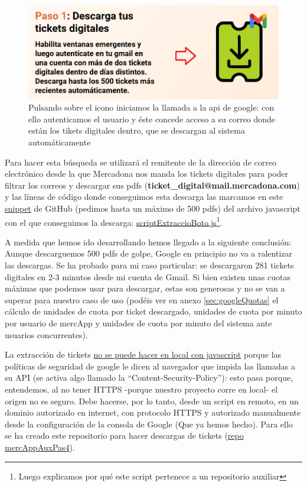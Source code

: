 \documentclass[a4paper,12pt]{report}
\begin{document}
	\begin{figure}[H]
		\centering
		\caption{Pulsando sobre el icono iniciamos la llamada a la api de google: con ello autenticamos el usuario y éste concede acceso a su correo donde están los tikets digitales dentro, que se descargan al sistema automáticamente}
		\includegraphics[width=1\linewidth]{img/pujarTicketsPas4}

		\label{fig:pujarticketspas4}
	\end{figure}
	
	
	Para hacer esta búsqueda se utilizará el remitente de la dirección  de correo electrónico desde la que  Mercadona nos manda los tickets digitales para poder filtrar los correos y descargar sus  pdfs (\textbf{ticket\_digital@mail.mercadona.com}) y las líneas de código donde conseguimos esta descarga las marcamos en este  \href{https://github.com/blackcub3s/mercAppAuxPas4/blob/e899ea50757bf3367c523f5a21d59f79bdb381ad/js/scriptExtraccioBoto.js#L89-L93}{snippet} de GitHub (pedimos hasta un máximo de 500 pdfs) del archivo javascript con el que conseguimos la descarga: \href{https://github.com/blackcub3s/mercAppAuxPas4/blob/main/js/scriptExtraccioBoto.js}{scriptExtraccioBoto.js}\footnote{Luego explicamos por qué este script pertenece a un repositorio auxiliar}.
	
	A medida que hemos ido desarrollando hemos llegado a la siguiente conclusión: Aunque descarguemos 500  pdfs de golpe, Google en principio no va a ralentizar las descargas. Se ha probado para mi caso particular: se descargaron 281 tickets digitales en 2-3 minutos desde mi cuenta de Gmail. Si bien existen unas cuotas máximas que podemos usar para descargar, estas son generosas y no se van a superar para nuestro caso de uso (podéis ver en anexo \ref{sec:googleQuotas} el cálculo de unidades de cuota por ticket descargado, unidades de cuota por minuto por usuario de mercApp y unidades de cuota por minuto del sistema ante usuarios concurrentes). 
	
	
	La extracción de tickets \underline{no se puede hacer en local con javascript} porque las políticas de seguridad de google le dicen al navegador que impida las llamadas a su API (se activa algo llamado la ``Content-Security-Policy''): esto pasa porque, entendemos, al no tener HTTPS -porque nuestro proyecto corre en local- el origen no es seguro. Debe hacerse, por lo tanto, desde un script en remoto, en un dominio autorizado en internet, con protocolo HTTPS y autorizado manualmente desde la configuración de la consola de Google (Que ya hemos hecho). Para ello se ha creado este repositorio para hacer descargas de tickets (\href{https://github.com/blackcub3s/mercAppAuxPas4/}{repo mercAppAuxPas4}).
	
\end{document}
